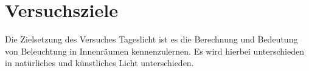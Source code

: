 \section{Versuchsziele}
Die Zielsetzung des Versuches Tageslicht ist es die Berechnung und Bedeutung von
Beleuchtung in Innenräumen kennenzulernen. Es wird hierbei unterschieden in natürliches
und künstliches Licht unterschieden.


